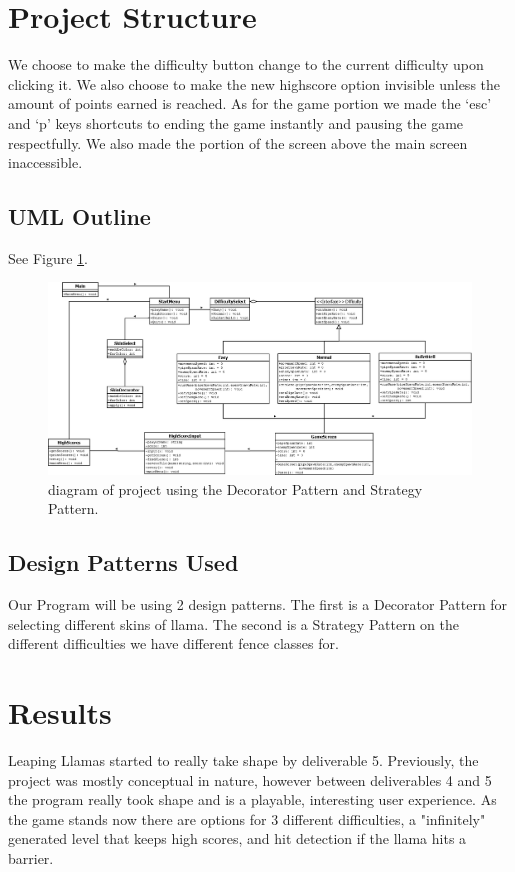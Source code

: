 \documentclass[10pt,conference,onecolumn,compsoc]{IEEEtran}
\begin{document}
\section{Project Structure}
We choose to make the difficulty button change to the current difficulty upon clicking it. We also choose to make the new highscore option invisible unless the amount of points earned is reached.
As for the game portion we made the `esc' and `p' keys shortcuts to ending the game instantly and pausing the game respectfully. We also made the portion of the screen above the main screen inaccessible.

\subsection{UML Outline}
See Figure \ref{dia}.

\begin{figure}
\includegraphics[scale=0.3]{LeapingLlamas.png}
\caption{diagram of project using the Decorator Pattern and Strategy Pattern.}
\label{dia}
\end{figure}

\subsection{Design Patterns Used}
Our Program will be using 2 design patterns. The first is a Decorator Pattern for selecting different skins of llama. The second is a Strategy Pattern on the different difficulties we have different fence classes for.

\section{Results}
Leaping Llamas started to really take shape by deliverable 5. Previously, the project was mostly conceptual in nature, however between deliverables 4 and 5 the program really took shape and is a playable, interesting user experience. As the game stands now there are options for 3 different difficulties, a "infinitely" generated level that keeps high scores, and hit detection if the llama hits a barrier.
\end{document}
